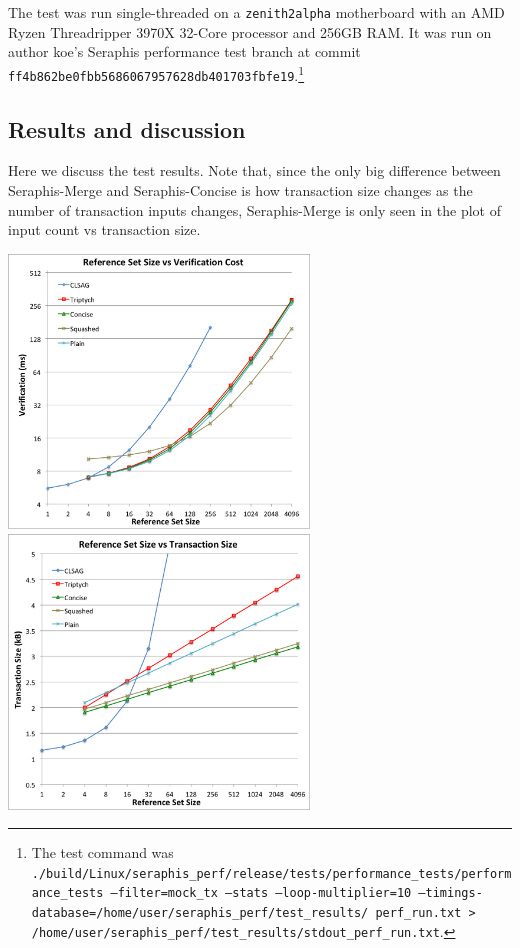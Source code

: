 The test was run single-threaded on a {\tt zenith2alpha} motherboard with an AMD Ryzen Threadripper 3970X 32-Core processor and 256GB RAM. It was run on author koe's Seraphis performance test branch \cite{seraphis-perf-branch} at commit {\tt ff4b862be0fbb5686067957628db401703fbfe19}.\footnote{The test command was {\tt ./build/Linux/seraphis\_perf/release/tests/performance\_tests/performance\_tests --filter=\*mock\_tx\* --stats --loop-multiplier=10 --timings-database=/home/user/seraphis\_perf/test\_results/ perf\_run.txt > /home/user/seraphis\_perf/test\_results/stdout\_perf\_run.txt}.}

\subsection{Results and discussion}
\label{subsec:efficiency-results-discussion}

Here we discuss the test results. Note that, since the only big difference between Seraphis-Merge and Seraphis-Concise is how transaction size changes as the number of transaction inputs changes, Seraphis-Merge is only seen in the plot of input count vs transaction size.

\begin{center}
    \includegraphics[width=8cm]{figures/refset_1batch_ver.png}
    \includegraphics[width=8cm]{figures/refset_1batch_size.png}
    \label{figure:efficiency-refsetsize-ver}
    \label{figure:efficiency-refsetsize-size}
\end{center}


